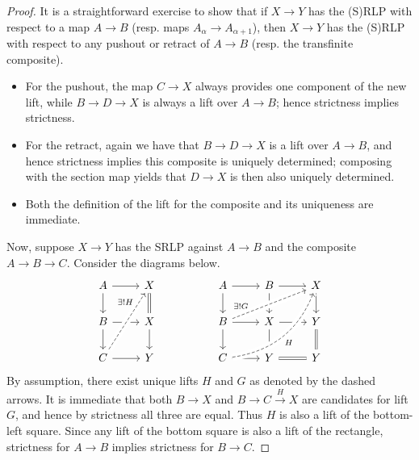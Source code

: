 \documentclass[a4paper,10pt,draft]{article}%
\begin{document}
\begin{proof}
      It is a straightforward exercise to show that
      if $X \to Y$ has the (S)RLP with respect to a map $A \to B$ (resp. maps $A_\alpha \to A_{\alpha +1}$), then
      $X \to Y$ has the (S)RLP with respect to any pushout or retract of $A \to B$ (resp. the transfinite composite).
      \begin{itemize}
      \item For the pushout, the map $C \to X$ always provides one component of the new lift,
            while $B \to D \to X$ is always a lift over $A \to B$; hence strictness implies strictness.
      \item For the retract, again we have that $B \to D \to X$ is a lift over $A \to B$,
            and hence strictness implies this composite is uniquely determined;
            composing with the section map yields that $D \to X$ is then also uniquely determined.
      \item Both the definition of the lift for the composite and its uniqueness are immediate.
      \end{itemize}
      Now, suppose $X \to Y$ has the SRLP against $A \to B$ and the composite $A \to B \to C$.
      Consider the diagrams below.
      \begin{equation}
            \begin{tikzcd}
                  A \arrow[r] \arrow[d]
                  &
                  X \arrow[d, equal]
                  &&
                  A \arrow[r] \arrow[d]
                  &
                  B \arrow[d] \arrow[r]
                  &
                  X \arrow[d]
                  \\
                  B \arrow[r] \arrow[d]
                  &
                  X \arrow[d]
                  &&
                  B \arrow[r] \arrow[d] \arrow[urr, crossing over, near start, dashed, "\exists ! G"]
                  &
                  X \arrow[r] \arrow[d]
                  &
                  Y \arrow[d, equal]
                  \\
                  C \arrow[r] \arrow[uur, dashed, crossing over, near end, "\exists ! H"]
                  &
                  Y
                  &&
                  C \arrow[r] \arrow[uurr, bend right, crossing over, dashed, "H"']
                  &
                  Y \arrow[r, equal]
                  &
                  Y
            \end{tikzcd}
      \end{equation}
      By assumption, there exist unique lifts $H$ and $G$ as denoted by the dashed arrows.
      It is immediate that both $B \to X$ and $B \to C \xrightarrow{H} X$ are candidates for lift $G$,
      and hence by strictness all three are equal.
      Thus $H$ is also a lift of the bottom-left square.
      Since any lift of the bottom square is also a lift of the rectangle,
      strictness for $A \to B$ implies strictness for $B \to C$.
\end{proof}
\end{document}
